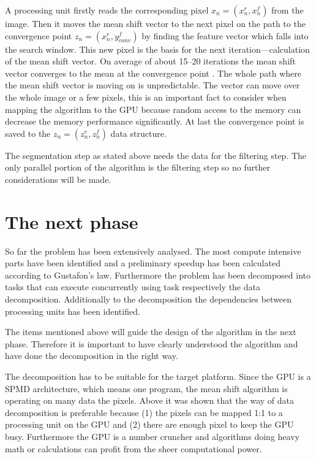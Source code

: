A processing unit firstly reads the corresponding pixel $x_n = (x_n^r, x_n^f)$
from the image. Then it moves the mean shift vector to the next pixel on the
path to the convergence point $z_n = (x_n^r, y_{conv}^f)$ by finding the feature
vector which falls into the search window. This new pixel is the basis for the
next iteration---calculation of the mean shift vector. On average of about
15--20 iterations the mean shift vector converges to the mean at the convergence
point \citep{DBLP:conf/eccv/ZhangKT06}. The whole path where the mean shift
vector is moving on is unpredictable. The vector can move over the whole image
or a few pixels, this is an important fact to consider when mapping the
algorithm to the \gls{GPU} because random access to the memory can decrease the
memory performance significantly. At last the convergence point is saved to the
$z_n = (z_n^r, z_n^f)$ data structure.

The segmentation step as stated above needs the data for the filtering step. The
only parallel portion of the algorithm is the filtering step so no further 
considerations will be made. 

\section{The next phase} %
\label{sec:analysis_summary}
So far the problem has been extensively analysed. The most compute intensive
parts have been identified and a preliminary speedup has been calculated
according to Gustafon's law. Furthermore the problem has been decomposed into
tasks that can execute concurrently using task respectively the data
decomposition. Additionally to the decomposition the dependencies between
processing units has been identified. 

The items  mentioned above will guide the design of the algorithm in the next
phase. Therefore it is important to have clearly understood the algorithm and
have done the decomposition in the right way. 

The decomposition has to be suitable for the target platform. Since the
\gls{GPU} is a \gls{SPMD} architecture, which means one program, the mean shift
algorithm is operating on many data the pixels. Above it was shown that the way
of data decomposition is preferable because (1) the pixels can be mapped 1:1 to
a processing unit on the \gls{GPU} and (2) there are enough pixel to keep the
\gls{GPU} busy. Furthermore the \gls{GPU} is a number cruncher and algorithms
doing heavy math or calculations can profit from the sheer computational power.


